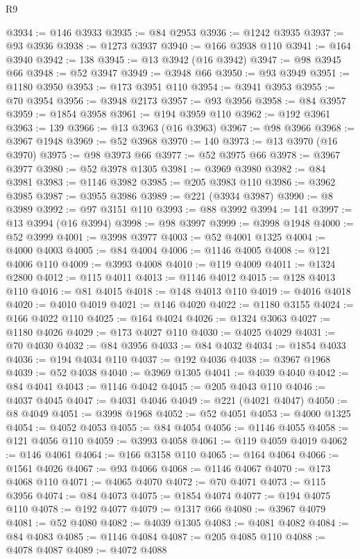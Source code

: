 \begin{lexlean}{R9}
\begin{coremodule}
@3934 := @146 @3933
@3935 := @84 @2953
@3936 := @1242 @3935
@3937 := @93 @3936
@3938 := @1273 @3937
@3940 := @166 @3938 @110
@3941 := @164 @3940
@3942 := 138
@3945 := @13 @3942 (@16 @3942)
@3947 := @98 @3945 @66
@3948 := @52 @3947
@3949 := @3948 @66
@3950 := @93 @3949
@3951 := @1180 @3950
@3953 := @173 @3951 @110
@3954 := @3941 @3953
@3955 := @70 @3954
@3956 := @3948 @2173
@3957 := @93 @3956
@3958 := @84 @3957
@3959 := @1854 @3958
@3961 := @194 @3959 @110
@3962 := @192 @3961
@3963 := 139
@3966 := @13 @3963 (@16 @3963)
@3967 := @98 @3966
@3968 := @3967 @1948
@3969 := @52 @3968
@3970 := 140
@3973 := @13 @3970 (@16 @3970)
@3975 := @98 @3973 @66
@3977 := @52 @3975 @66
@3978 := @3967 @3977
@3980 := @52 @3978 @1305
@3981 := @3969 @3980
@3982 := @84 @3981
@3983 := @1146 @3982
@3985 := @205 @3983 @110
@3986 := @3962 @3985
@3987 := @3955 @3986
@3989 := @221 (@3934 @3987)
@3990 := @8 @3989
@3992 := @97 @3151 @110
@3993 := @88 @3992
@3994 := 141
@3997 := @13 @3994 (@16 @3994)
@3998 := @98 @3997
@3999 := @3998 @1948
@4000 := @52 @3999
@4001 := @3998 @3977
@4003 := @52 @4001 @1325
@4004 := @4000 @4003
@4005 := @84 @4004
@4006 := @1146 @4005
@4008 := @121 @4006 @110
@4009 := @3993 @4008
@4010 := @119 @4009
@4011 := @1324 @2800
@4012 := @115 @4011
@4013 := @1146 @4012
@4015 := @128 @4013 @110
@4016 := @81 @4015
@4018 := @148 @4013 @110
@4019 := @4016 @4018
@4020 := @4010 @4019
@4021 := @146 @4020
@4022 := @1180 @3155
@4024 := @166 @4022 @110
@4025 := @164 @4024
@4026 := @1324 @3063
@4027 := @1180 @4026
@4029 := @173 @4027 @110
@4030 := @4025 @4029
@4031 := @70 @4030
@4032 := @84 @3956
@4033 := @84 @4032
@4034 := @1854 @4033
@4036 := @194 @4034 @110
@4037 := @192 @4036
@4038 := @3967 @1968
@4039 := @52 @4038
@4040 := @3969 @1305
@4041 := @4039 @4040
@4042 := @84 @4041
@4043 := @1146 @4042
@4045 := @205 @4043 @110
@4046 := @4037 @4045
@4047 := @4031 @4046
@4049 := @221 (@4021 @4047)
@4050 := @8 @4049
@4051 := @3998 @1968
@4052 := @52 @4051
@4053 := @4000 @1325
@4054 := @4052 @4053
@4055 := @84 @4054
@4056 := @1146 @4055
@4058 := @121 @4056 @110
@4059 := @3993 @4058
@4061 := @119 @4059 @4019
@4062 := @146 @4061
@4064 := @166 @3158 @110
@4065 := @164 @4064
@4066 := @1561 @4026
@4067 := @93 @4066
@4068 := @1146 @4067
@4070 := @173 @4068 @110
@4071 := @4065 @4070
@4072 := @70 @4071
@4073 := @115 @3956
@4074 := @84 @4073
@4075 := @1854 @4074
@4077 := @194 @4075 @110
@4078 := @192 @4077
@4079 := @1317 @66
@4080 := @3967 @4079
@4081 := @52 @4080
@4082 := @4039 @1305
@4083 := @4081 @4082
@4084 := @84 @4083
@4085 := @1146 @4084
@4087 := @205 @4085 @110
@4088 := @4078 @4087
@4089 := @4072 @4088

\end{coremodule}
\end{lexlean}
